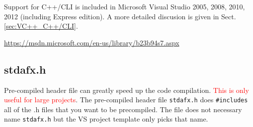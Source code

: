 Support for C++/CLI is included in Microsoft Visual Studio 2005, 2008, 2010,
2012 (including Express edition).
A more detailed discusion is given in Sect.\ref{sec:VC++_C++/CLI}.
    
\url{https://msdn.microsoft.com/en-us/library/b23b94s7.aspx}


\subsection{stdafx.h}
\label{sec:stdafx.h}

Pre-compiled header file can greatly speed up the code compilation.
\textcolor{red}{This is only useful for large projects}.
The pre-compiled header file \verb!stdafx.h!  does \verb!#includes! all of the
.h files that you want to be precompiled. The file does not necessary name
\verb!stdafx.h! but the VS project template only picks that name. 

